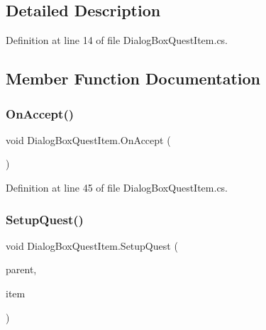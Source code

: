 \subsection{Detailed Description}


Definition at line 14 of file Dialog\+Box\+Quest\+Item.\+cs.



\subsection{Member Function Documentation}
\mbox{\label{class_dialog_box_quest_item_ad70c4f8dc0e51a6d8b1b291e4ac79ebc}} 
\subsubsection{\texorpdfstring{On\+Accept()}{OnAccept()}}
{\footnotesize\ttfamily void Dialog\+Box\+Quest\+Item.\+On\+Accept (\begin{DoxyParamCaption}{ }\end{DoxyParamCaption})}



Definition at line 45 of file Dialog\+Box\+Quest\+Item.\+cs.

\mbox{\label{class_dialog_box_quest_item_ae5ad7b66d4a6f3052912ff3248a450ce}} 
\subsubsection{\texorpdfstring{Setup\+Quest()}{SetupQuest()}\hspace{0.1cm}{\footnotesize\ttfamily [1/2]}}
{\footnotesize\ttfamily void Dialog\+Box\+Quest\+Item.\+Setup\+Quest (\begin{DoxyParamCaption}\item[{\hyperlink{class_dialog_box_quests}{Dialog\+Box\+Quests}}]{parent,  }\item[{\hyperlink{class_quest}{Quest}}]{item }\end{DoxyParamCaption})}



